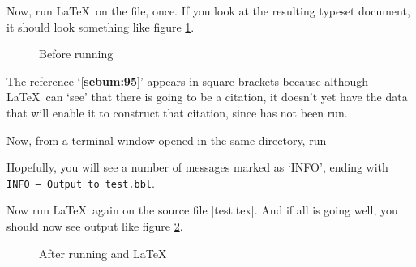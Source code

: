 Now, run \LaTeX\ on the file, once. If you look at the resulting
typeset document, it should look something like figure
\ref{nussbaum1}.

\begin{figure}
\caption{Before running }\label{nussbaum1}
\end{figure}

The reference `[\textbf{sebum:95}]' appears in square brackets
because although \LaTeX\ can `see' that there is going to be a
citation, it doesn't yet have the data that will enable it to
construct that citation, since  has not been run.

Now, from a terminal window opened in the same directory, run

Hopefully, you will see a number of messages marked as `INFO', ending
with \texttt{INFO -- Output to test.bbl}.

Now run \LaTeX\ again on the source file |test.tex|. And if all is
going well, you should now see output like figure \ref{nussbaum2}.

\begin{figure}
\caption{After running  and \LaTeX}\label{nussbaum2}
\end{figure}

